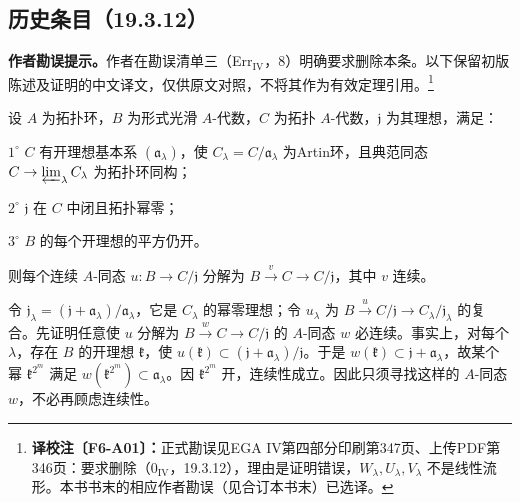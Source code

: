 \documentclass[UTF8,a4paper]{ctexbook}
\newcommand{\cmt}[2]{\footnote{\textbf{译校注〔#1〕：}#2}}
\begin{document}
\subsection*{历史条目（19.3.12）}
\noindent\textbf{作者勘误提示。}作者在勘误清单三（Err$_{\mathrm{IV}}$，8）明确要求删除本条。以下保留初版陈述及证明的中文译文，仅供原文对照，不将其作为有效定理引用。\cmt{F6-A01}{正式勘误见EGA IV第四部分印刷第347页、上传PDF第346页：要求删除（$0_{\mathrm{IV}}$，19.3.12），理由是证明错误，$W_\lambda,U_\lambda,V_\lambda$ 不是线性流形。本书书末的相应作者勘误（见合订本书末）已选译。}

设 $A$ 为拓扑环，$B$ 为形式光滑 $A$-代数，$C$ 为拓扑 $A$-代数，$\mathfrak j$ 为其理想，满足：

$1^\circ$ $C$ 有开理想基本系 $(\mathfrak a_\lambda)$，使 $C_\lambda=C/\mathfrak a_\lambda$ 为Artin环，且典范同态 $C\to\varprojlim_\lambda C_\lambda$ 为拓扑环同构；

$2^\circ$ $\mathfrak j$ 在 $C$ 中闭且拓扑幂零；

$3^\circ$ $B$ 的每个开理想的平方仍开。

则每个连续 $A$-同态 $u:B\to C/\mathfrak j$ 分解为 $B\xrightarrow{v}C\to C/\mathfrak j$，其中 $v$ 连续。

令 $\mathfrak j_\lambda=(\mathfrak j+\mathfrak a_\lambda)/\mathfrak a_\lambda$，它是 $C_\lambda$ 的幂零理想；令 $u_\lambda$ 为 $B\xrightarrow{u}C/\mathfrak j\to C_\lambda/\mathfrak j_\lambda$ 的复合。先证明任意使 $u$ 分解为 $B\xrightarrow{w}C\to C/\mathfrak j$ 的 $A$-同态 $w$ 必连续。事实上，对每个 $\lambda$，存在 $B$ 的开理想 $\mathfrak k$，使 $u(\mathfrak k)\subset(\mathfrak j+\mathfrak a_\lambda)/\mathfrak j$。于是 $w(\mathfrak k)\subset\mathfrak j+\mathfrak a_\lambda$，故某个幂 $\mathfrak k^{2^m}$ 满足 $w(\mathfrak k^{2^m})\subset\mathfrak a_\lambda$。因 $\mathfrak k^{2^m}$ 开，连续性成立。因此只须寻找这样的 $A$-同态 $w$，不必再顾虑连续性。
\end{document}
